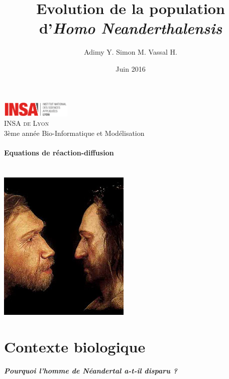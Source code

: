 \documentclass[a4paper,11pt]{article}
\begin{document}
\author{Adimy Y.  Simon M.  Vassal H.}
\title{\Huge\textbf{ Evolution de la population \\ \vspace{0.5cm} d'\textit{Homo Neanderthalensis}} \vspace{0.5cm}}
\date{Juin 2016}

\makeatletter
  \begin{titlepage}
  \centering
  	\vfill
      \includegraphics[width=0.25\textwidth]{logo_insa.png}\\
  	\vspace{0.5cm}
      {\large \textsc{INSA de Lyon}}\\
      3ème année Bio-Informatique et Modélisation\\
    \vfill
      \textbf{\Huge\@title}\\
    \vspace{0.3cm}
      \textbf{\Large Equations de réaction-diffusion}\\
    \vspace{0.3cm}
       {\large \@author} \\
    \vspace{0.3cm}
        {\large\textbf{\@date}}\\
    \vfill
    	\centering
        \includegraphics[scale=1]{neanderthal-sapiens.jpg}
  \end{titlepage}
\makeatother
\newpage
\tableofcontents
\newpage

\setcounter{page}{1}

\section{Contexte biologique}
\begin{center}
	\textbf{\textit{Pourquoi l'homme de Néandertal a-t-il disparu ? }}
\end{center}
\end{document}
